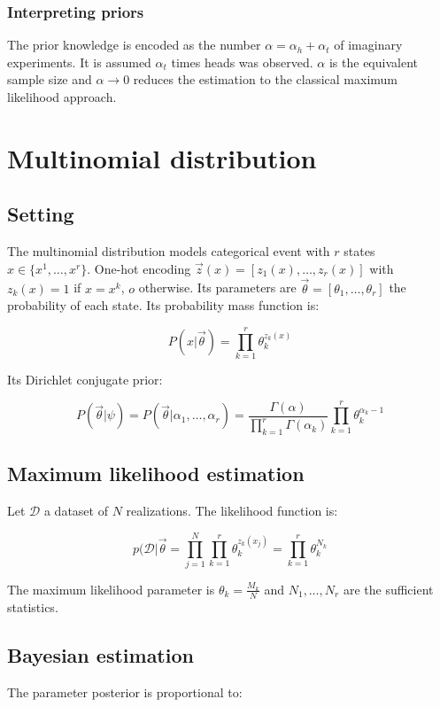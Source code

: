 		\subsubsection{Interpreting priors}
		The prior knowledge is encoded as the number $\alpha=\alpha_h+\alpha_t$ of imaginary experiments.
		It is assumed $\alpha_t$ times heads was observed.
		$\alpha$ is the equivalent sample size and $\alpha\rightarrow 0$ reduces the estimation to the classical maximum likelihood approach.

\section{Multinomial distribution}

	\subsection{Setting}
	The multinomial distribution models categorical event with $r$ states $x\in\{x^1,\dots,x^r\}$.
	One-hot encoding $\vec{z}(x) = [z_1(x), \dots, z_r(x)]$ with $z_k(x) = 1$ if $x=x^k$, $o$ otherwise.
	Its parameters are $\vec{\theta} = [\theta_1, \dots, \theta_r]$ the probability  of each state.
	Its probability mass function is:

	$$P(x|\vec{\theta}) = \prod\limits_{k=1}^r\theta_k^{z_k(x)}$$

	Its Dirichlet conjugate prior:

	$$P(\vec{\theta}|\psi) = P(\vec{\theta}|\alpha_1, \dots, \alpha_r) = \frac{\Gamma(\alpha)}{\prod\limits_{k=1}^r\Gamma(\alpha_k)}\prod\limits_{k=1}^r\theta_k^{\alpha_k-1}$$

	\subsection{Maximum likelihood estimation}
	Let $\mathcal{D}$ a dataset of $N$ realizations.
	The likelihood function is:

	$$p(\mathcal{D}|\vec{\theta} = \prod\limits_{j=1}^N\prod\limits_{k=1}^r\theta_k^{z_k(x_j)} = \prod\limits_{k=1}^r\theta_k^{N_k}$$

	The maximum likelihood parameter is $\theta_k= \frac{M_k}{N}$ and $N_1, \dots, N_r$ are the sufficient statistics.

	\subsection{Bayesian estimation}
	The parameter posterior is proportional to:

